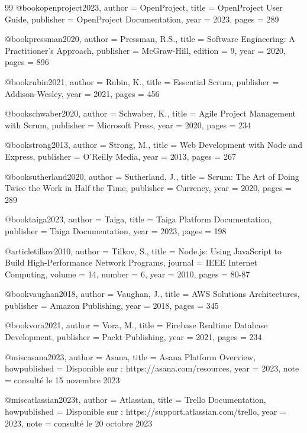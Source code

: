 \begin{thebibliography}{99}
@book{openproject2023,
  author = {OpenProject},
  title = {OpenProject User Guide},
  publisher = {OpenProject Documentation},
  year = {2023},
  pages = {289}
}

@book{pressman2020,
  author = {Pressman, R.S.},
  title = {Software Engineering: A Practitioner's Approach},
  publisher = {McGraw-Hill},
  edition = {9},
  year = {2020},
  pages = {896}
}

@book{rubin2021,
  author = {Rubin, K.},
  title = {Essential Scrum},
  publisher = {Addison-Wesley},
  year = {2021},
  pages = {456}
}

@book{schwaber2020,
  author = {Schwaber, K.},
  title = {Agile Project Management with Scrum},
  publisher = {Microsoft Press},
  year = {2020},
  pages = {234}
}

@book{strong2013,
  author = {Strong, M.},
  title = {Web Development with Node and Express},
  publisher = {O'Reilly Media},
  year = {2013},
  pages = {267}
}

@book{sutherland2020,
  author = {Sutherland, J.},
  title = {Scrum: The Art of Doing Twice the Work in Half the Time},
  publisher = {Currency},
  year = {2020},
  pages = {289}
}

@book{taiga2023,
  author = {Taiga},
  title = {Taiga Platform Documentation},
  publisher = {Taiga Documentation},
  year = {2023},
  pages = {198}
}

@article{tilkov2010,
  author = {Tilkov, S.},
  title = {Node.js: Using JavaScript to Build High-Performance Network Programs},
  journal = {IEEE Internet Computing},
  volume = {14},
  number = {6},
  year = {2010},
  pages = {80-87}
}

@book{vaughan2018,
  author = {Vaughan, J.},
  title = {AWS Solutions Architectures},
  publisher = {Amazon Publishing},
  year = {2018},
  pages = {345}
}

@book{vora2021,
  author = {Vora, M.},
  title = {Firebase Realtime Database Development},
  publisher = {Packt Publishing},
  year = {2021},
  pages = {234}
}

@misc{asana2023,
  author = {Asana},
  title = {Asana Platform Overview},
  howpublished = {Disponible sur : https://asana.com/resources},
  year = {2023},
  note = {consulté le 15 novembre 2023}
}

@misc{atlassian2023t,
  author = {Atlassian},
  title = {Trello Documentation},
  howpublished = {Disponible sur : https://support.atlassian.com/trello},
  year = {2023},
  note = {consulté le 20 octobre 2023}
}


\end{thebibliography}

